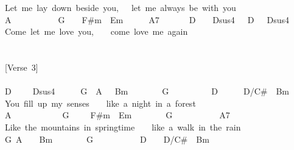 \documentclass[]{book}
\begin{document}
Let~me~lay~down~beside~you,~~~let~me~always~be~with~you\\
A~~~~~~~~~~~G~~~~F\#m~~Em~~~~~~A7~~~~~~~D~~~~Dsus4~~~D~~~Dsus4\\
Come~let~me~love~you,~~~~come~love~me~again\\
~\\
~\\
{[}Verse~3{]}\\
~\\
D~~~~~Dsus4~~~~~~G~~A~~~Bm~~~~~~~~G~~~~~~~~~~D~~~~~~D/C\#~~Bm\\
\hspace*{0.333em}\hspace*{0.333em}You~fill~up~my~senses~~~~like~a~night~in~a~forest\\
\hspace*{0.333em}\hspace*{0.333em}\hspace*{0.333em}\hspace*{0.333em}\hspace*{0.333em}\hspace*{0.333em}\hspace*{0.333em}\hspace*{0.333em}\hspace*{0.333em}A~~~~~~~~~~~~G~~~~~F\#m~~Em~~~~~~~~G~~~~~~~~~~~A7\\
Like~the~mountains~in~springtime~~~~like~a~walk~in~the~rain\\
\hspace*{0.333em}\hspace*{0.333em}\hspace*{0.333em}\hspace*{0.333em}\hspace*{0.333em}\hspace*{0.333em}\hspace*{0.333em}\hspace*{0.333em}\hspace*{0.333em}\hspace*{0.333em}\hspace*{0.333em}\hspace*{0.333em}\hspace*{0.333em}\hspace*{0.333em}\hspace*{0.333em}\hspace*{0.333em}\hspace*{0.333em}\hspace*{0.333em}\hspace*{0.333em}\hspace*{0.333em}G~A~~~~Bm~~~~~~~~G~~~~~~~~~~~D~~~~D/C\#~~Bm\\
\end{document}
